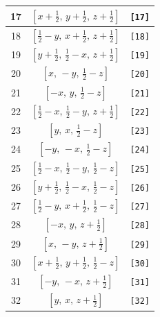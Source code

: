 \documentclass[fleqn,8pt]{jsarticle}
\begin{document}
\begin{longtable}{ccc}
17 & $\left[ x + \frac{1}{2},\, y + \frac{1}{2},\, z + \frac{1}{2} \right]$ & {\tt [17]} \\ \hline
18 & $\left[ \frac{1}{2} - y,\, x + \frac{1}{2},\, z + \frac{1}{2} \right]$ & {\tt [18]} \\ \hline
19 & $\left[ y + \frac{1}{2},\, \frac{1}{2} - x,\, z + \frac{1}{2} \right]$ & {\tt [19]} \\ \hline
20 & $\left[ x,\, - y,\, \frac{1}{2} - z \right]$ & {\tt [20]} \\ \hline
21 & $\left[ - x,\, y,\, \frac{1}{2} - z \right]$ & {\tt [21]} \\ \hline
22 & $\left[ \frac{1}{2} - x,\, \frac{1}{2} - y,\, z + \frac{1}{2} \right]$ & {\tt [22]} \\ \hline
23 & $\left[ y,\, x,\, \frac{1}{2} - z \right]$ & {\tt [23]} \\ \hline
24 & $\left[ - y,\, - x,\, \frac{1}{2} - z \right]$ & {\tt [24]} \\ \hline
25 & $\left[ \frac{1}{2} - x,\, \frac{1}{2} - y,\, \frac{1}{2} - z \right]$ & {\tt [25]} \\ \hline
26 & $\left[ y + \frac{1}{2},\, \frac{1}{2} - x,\, \frac{1}{2} - z \right]$ & {\tt [26]} \\ \hline
27 & $\left[ \frac{1}{2} - y,\, x + \frac{1}{2},\, \frac{1}{2} - z \right]$ & {\tt [27]} \\ \hline
28 & $\left[ - x,\, y,\, z + \frac{1}{2} \right]$ & {\tt [28]} \\ \hline
29 & $\left[ x,\, - y,\, z + \frac{1}{2} \right]$ & {\tt [29]} \\ \hline
30 & $\left[ x + \frac{1}{2},\, y + \frac{1}{2},\, \frac{1}{2} - z \right]$ & {\tt [30]} \\ \hline
31 & $\left[ - y,\, - x,\, z + \frac{1}{2} \right]$ & {\tt [31]} \\ \hline
32 & $\left[ y,\, x,\, z + \frac{1}{2} \right]$ & {\tt [32]} \\
\end{longtable}
\end{document}

